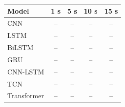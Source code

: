 \begin{tabular}{lcccc}
\toprule
Model & 1 s & 5 s & 10 s & 15 s \\
\midrule
CNN & -- & -- & -- & -- \\
LSTM & -- & -- & -- & -- \\
BiLSTM & -- & -- & -- & -- \\
GRU & -- & -- & -- & -- \\
CNN-LSTM & -- & -- & -- & -- \\
TCN & -- & -- & -- & -- \\
Transformer & -- & -- & -- & -- \\
\bottomrule
\end{tabular}

